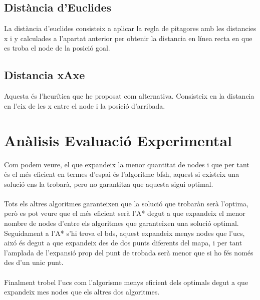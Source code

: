 \documentclass{article}
\begin{document}
\subsection{Distància d'Euclides}
La distància d'euclides consisteix a aplicar la regla de pitagores amb les distancies x i y calculades a l'apartat anterior per obtenir la distancia en línea recta en que es troba el node de la posició goal.
\subsection{Distancia xAxe}
Aquesta és l'heurítica que he proposat com alternativa. Consisteix en la distancia en l'eix de les x entre el node i la posició d'arribada.

\section{Anàlisis Evaluació Experimental}
Com podem veure, el que expandeix la menor quantitat de nodes i que per tant és el més eficient en termes d'espai és l'algoritme bfsh, aquest si existeix una solució ens la trobarà, pero no garantitza que aquesta sigui optimal. 
\\\\
Tots els altres algoritmes garanteixen que la solució que trobaràn serà l'optima, però es pot veure que el més eficient serà l'A* degut a que expandeix el menor nombre de nodes d'entre els algoritmes que garanteixen una solució optimal.\\
Seguidament a l'A* s'hi trova el bds, aquest expandeix menys nodes que l'ucs, aixó és degut a que expandeix des de dos punts diferents del mapa, i per tant l'amplada de l'expansió prop del punt de trobada serà menor que si ho fés només des d'un unic punt.
\\\\
Finalment trobel l'ucs com l'algorisme menys eficient dels optimals degut a que expandeix mes nodes que els altres dos algoritmes.
\\\\ 
\end{document}
